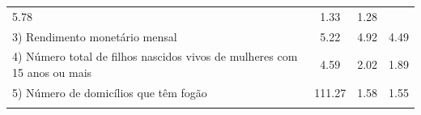 \documentclass[]{book}
\theoremstyle{definition}
\theoremstyle{definition}
\theoremstyle{definition}
\theoremstyle{remark}
\begin{document}
\begin{longtable}[]{@{}lccc@{}}
\begin{minipage}[t]{0.19\columnwidth}
5.78\strut
\end{minipage} & \begin{minipage}[t]{0.20\columnwidth}\centering\strut
1.33\strut
\end{minipage} & \begin{minipage}[t]{0.26\columnwidth}\centering\strut
1.28\strut
\end{minipage}\tabularnewline
\begin{minipage}[t]{0.24\columnwidth}\raggedright\strut
3) Rendimento monetário mensal\strut
\end{minipage} & \begin{minipage}[t]{0.19\columnwidth}\centering\strut
5.22\strut
\end{minipage} & \begin{minipage}[t]{0.20\columnwidth}\centering\strut
4.92\strut
\end{minipage} & \begin{minipage}[t]{0.26\columnwidth}\centering\strut
4.49\strut
\end{minipage}\tabularnewline
\begin{minipage}[t]{0.24\columnwidth}\raggedright\strut
4) Número total de filhos nascidos vivos de mulheres com 15 anos ou
mais\strut
\end{minipage} & \begin{minipage}[t]{0.19\columnwidth}\centering\strut
4.59\strut
\end{minipage} & \begin{minipage}[t]{0.20\columnwidth}\centering\strut
2.02\strut
\end{minipage} & \begin{minipage}[t]{0.26\columnwidth}\centering\strut
1.89\strut
\end{minipage}\tabularnewline
\begin{minipage}[t]{0.24\columnwidth}\raggedright\strut
5) Número de domicílios que têm fogão\strut
\end{minipage} & \begin{minipage}[t]{0.19\columnwidth}\centering\strut
111.27\strut
\end{minipage} & \begin{minipage}[t]{0.20\columnwidth}\centering\strut
1.58\strut
\end{minipage} & \begin{minipage}[t]{0.26\columnwidth}\centering\strut
1.55\strut
\end{minipage}\tabularnewline
\begin{minipage}[t]{0.24\columnwidth}\raggedright\strut

\end{minipage}
\end{longtable}
\end{document}
